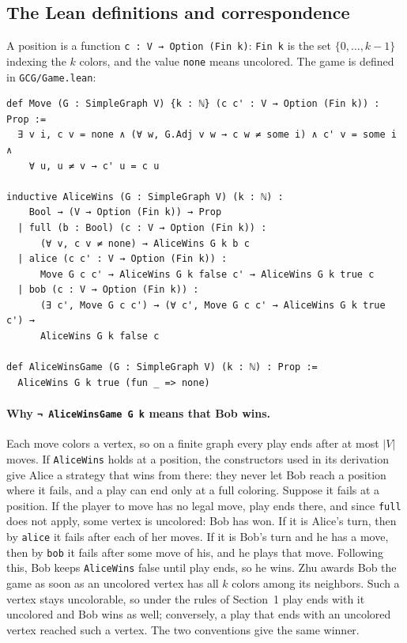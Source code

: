 \documentclass[11pt]{article}
\theoremstyle{remark}
\begin{document}
\begin{appendices}
\section{The Lean definitions and correspondence}\label{app:lean}
A position is a function \texttt{c : V → Option (Fin k)}: \texttt{Fin k}
is the set $\{0,\dots,k-1\}$ indexing the $k$ colors, and the value
\texttt{none} means uncolored. The game is defined in
\texttt{GCG/Game.lean}:
\begin{verbatim}
def Move (G : SimpleGraph V) {k : ℕ} (c c' : V → Option (Fin k)) : Prop :=
  ∃ v i, c v = none ∧ (∀ w, G.Adj v w → c w ≠ some i) ∧ c' v = some i ∧
    ∀ u, u ≠ v → c' u = c u

inductive AliceWins (G : SimpleGraph V) (k : ℕ) :
    Bool → (V → Option (Fin k)) → Prop
  | full (b : Bool) (c : V → Option (Fin k)) :
      (∀ v, c v ≠ none) → AliceWins G k b c
  | alice (c c' : V → Option (Fin k)) :
      Move G c c' → AliceWins G k false c' → AliceWins G k true c
  | bob (c : V → Option (Fin k)) :
      (∃ c', Move G c c') → (∀ c', Move G c c' → AliceWins G k true c') →
      AliceWins G k false c

def AliceWinsGame (G : SimpleGraph V) (k : ℕ) : Prop :=
  AliceWins G k true (fun _ => none)
\end{verbatim}

\paragraph{Why \texttt{¬ AliceWinsGame G k} means that Bob wins.}
Each move colors a vertex, so on a finite graph every play ends after at
most $|V|$ moves. If \texttt{AliceWins} holds at a position, the
constructors used in its derivation give Alice a strategy that wins from
there: they never let Bob reach a position where it fails, and a play can
end only at a full coloring. Suppose it fails at a position. If the player
to move has no legal move, play ends there, and since \texttt{full} does
not apply, some vertex is uncolored: Bob has won. If it is Alice's turn,
then by \texttt{alice} it fails after each of her moves. If it is Bob's
turn and he has a move, then by \texttt{bob} it fails after some move of
his, and he plays that move. Following this, Bob keeps \texttt{AliceWins}
false until play ends, so he wins. Zhu \cite[pp.~1--2]{Zhu} awards Bob the
game as soon as an uncolored vertex has all $k$ colors among its
neighbors. Such a vertex stays uncolorable, so under the rules of
Section~1 play ends with it uncolored and Bob wins as well; conversely, a
play that ends with an uncolored vertex reached such a vertex. The two
conventions give the same winner.


\end{appendices}
\end{document}
